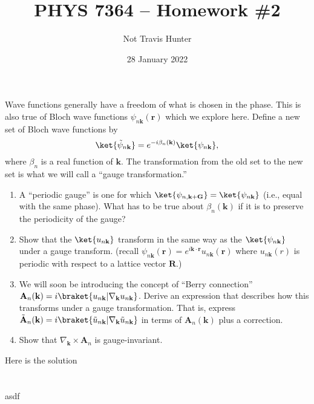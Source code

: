 \documentclass{cthhw}
\author{Not Travis Hunter}
\title{PHYS 7364 -- Homework \#2}
\date{28 January 2022}
\begin{document}
	

Wave functions generally have a freedom of what is chosen in the phase.
This is also true of Bloch wave functions $\psi_{n\mathbf k}(\mathbf r)$ which we explore here.
Define a new set of Bloch wave functions by
\begin{equation}
	\label{eq:1}
	\ket{\tilde \psi_{n\mathbf k}} = e^{-i\beta_{n}(\mathbf k)}\ket{\psi_{n\mathbf k}},
\end{equation}
where $\beta_{n}$ is a real function of $\mathbf k$. The transformation from the old set to the new set is what we will call a ``gauge transformation.''
\begin{enumerate}
	\item A ``periodic gauge'' is one for which $\ket{\psi_{n,\mathbf k+ \mathbf G}} = \ket{\psi_{n\mathbf k}}$ (i.e., equal with the same phase). What has to be true about $\beta_{n}(\mathbf k)$ if it is to preserve the periodicity of the gauge?
	\item Show that the $\ket{u_{n\mathbf k}}$ transform in the same way as the $\ket{\psi_{n\mathbf k}}$ under a gauge transform. (recall $\psi_{n\mathbf k}(\mathbf r) = e^{i \mathbf k\cdot \mathbf r} u_{n\mathbf k}(\mathbf r)$ where $u_{n\mathbf k}(r)$ is periodic with respect to a lattice vector $\mathbf R$.)
	\item We will soon be introducing the concept of ``Berry connection'' $\mathbf A_{n}(\mathbf k) = i \braket{u_{n\mathbf k} | \nabla_{\mathbf k} u_{n\mathbf k}}$. Derive an expression that describes how this transforms under a gauge transformation. That is, express $\tilde{\mathbf A}_{n}(\mathbf k) = i \braket{\tilde u_{n\mathbf k} | \nabla_{\mathbf k} \tilde u_{n\mathbf k}}$ in terms of $\mathbf A_{n}(\mathbf k)$ plus a correction.
	\item Show that $\nabla_{\mathbf k} \times \mathbf A_{n}$ is gauge-invariant.
\end{enumerate}

\solution{}
Here is the solution
\part{}
asdf



\end{document}
